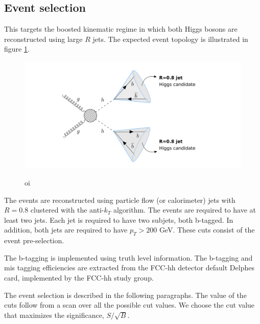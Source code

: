 \subsection{Event selection}

This targets the boosted kinematic regime in which both Higgs bosons are reconstructed using large $R$ jets. The expected event topology is illustrated in figure \ref{fig:boosted}.

\begin{figure}[h]
	\centering
	\includegraphics[trim={4.5cm .5cm 1cm .5cm},clip,width=1.2\linewidth]{./images/boosted1.png}
	\label{fig:boosted}
	\caption{oi}
\end{figure}

The events are reconstructed using particle flow (or calorimeter) jets with $R=0.8$ clustered with the anti-$k_T$ algorithm. The events are required to have at least two jets. Each jet is required to have two subjets, both b-tagged. In addition, both jets are required to have $p_T>200$ GeV. These cuts consist of the event pre-selection.

The b-tagging is implemented using truth level information. The b-tagging and mis tagging efficiencies are extracted from the FCC-hh detector default Delphes card, implemented by the FCC-hh study group.

The event selection is described in the following paragraphs. The value of the cuts follow from a scan over all the possible cut values. We choose the cut value that maximizes the significance, $S/\sqrt{B}$. 


